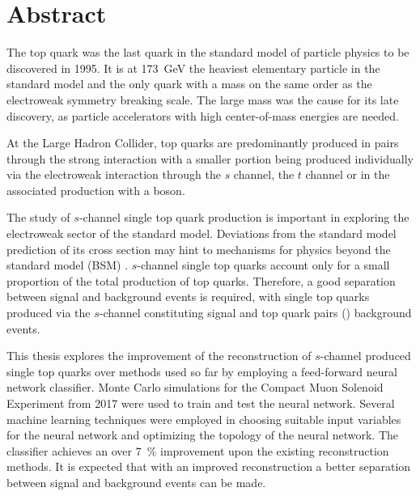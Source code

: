 \chapter*{Abstract}

The top quark was the last quark in the standard model of particle physics to be discovered in 1995. It is at \SI{173}{GeV} the heaviest elementary particle in the standard model and the only quark with a mass on the same order as the electroweak symmetry breaking scale. The large mass was the cause for its late discovery, as particle accelerators with high center-of-mass energies are needed.

At the Large Hadron Collider, top quarks are predominantly produced in pairs through the strong interaction with a smaller portion being produced individually via the electroweak interaction through the $s$ channel, the $t$ channel or in the associated production with a \PW boson.

The study of $s$-channel single top quark production is important in exploring the electroweak sector of the standard model. Deviations from the standard model prediction of its cross section may hint to mechanisms for physics beyond the standard model (BSM) \cite{CMS16}. $s$-channel single top quarks account only for a small proportion of the total production of top quarks. Therefore, a good separation between signal and background events is required, with single top quarks produced via the $s$-channel constituting signal and top quark pairs (\PtopNOSPACE\APtop) background events. 

This thesis explores the improvement of the reconstruction of $s$-channel produced single top quarks over methods used so far by employing a feed-forward neural network classifier. Monte Carlo simulations for the Compact Muon Solenoid Experiment from 2017 were used to train and test the neural network. Several machine learning techniques were employed in choosing suitable input variables for the neural network and optimizing the topology of the neural network. The classifier achieves an over \SI{7}{\%} improvement upon the existing reconstruction methods. It is expected that with an improved reconstruction a better separation between signal and background events can be made.